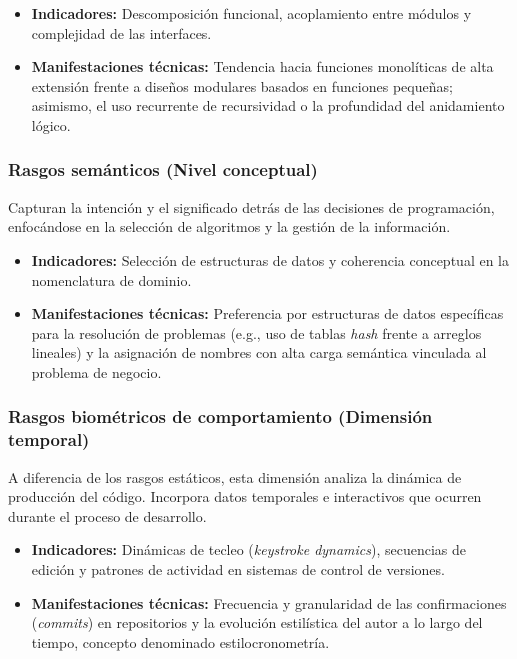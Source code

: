 \begin{itemize}
    \item \textbf{Indicadores:} Descomposición funcional, acoplamiento entre módulos y complejidad de las interfaces.
    \item \textbf{Manifestaciones técnicas:} Tendencia hacia funciones monolíticas de alta extensión frente a diseños modulares basados en funciones pequeñas; asimismo, el uso recurrente de recursividad o la profundidad del anidamiento lógico.
\end{itemize}

\subsubsection{Rasgos semánticos (Nivel conceptual)}
Capturan la intención y el significado detrás de las decisiones de programación, enfocándose en la selección de algoritmos y la gestión de la información.

\begin{itemize}
    \item \textbf{Indicadores:} Selección de estructuras de datos y coherencia conceptual en la nomenclatura de dominio.
    \item \textbf{Manifestaciones técnicas:} Preferencia por estructuras de datos específicas para la resolución de problemas (e.g., uso de tablas \textit{hash} frente a arreglos lineales) y la asignación de nombres con alta carga semántica vinculada al problema de negocio.
\end{itemize}

\subsubsection{Rasgos biométricos de comportamiento (Dimensión temporal)}
A diferencia de los rasgos estáticos, esta dimensión analiza la dinámica de producción del código. Incorpora datos temporales e interactivos que ocurren durante el proceso de desarrollo.

\begin{itemize}
    \item \textbf{Indicadores:} Dinámicas de tecleo (\textit{keystroke dynamics}), secuencias de edición y patrones de actividad en sistemas de control de versiones.
    \item \textbf{Manifestaciones técnicas:} Frecuencia y granularidad de las confirmaciones (\textit{commits}) en repositorios y la evolución estilística del autor a lo largo del tiempo, concepto denominado estilocronometría.
\end{itemize}

